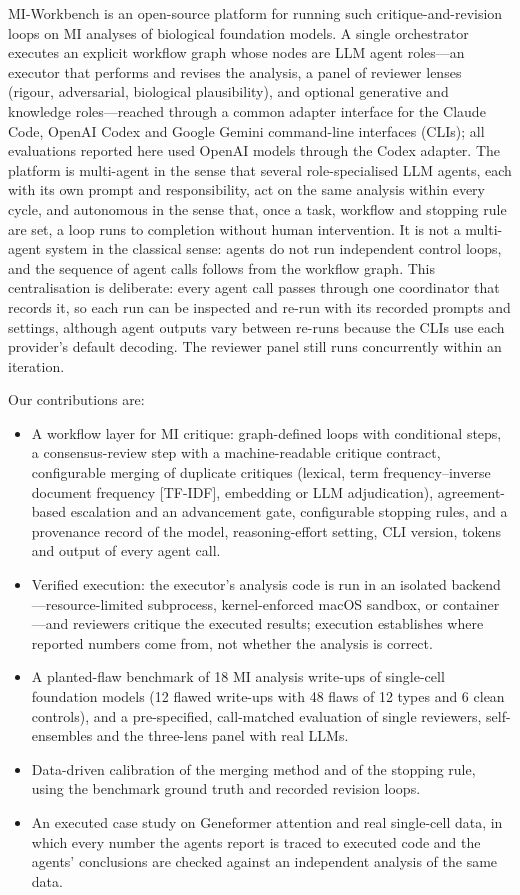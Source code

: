 MI-Workbench is an open-source platform for running such critique-and-revision loops on MI analyses of biological foundation models. A single orchestrator executes an explicit workflow graph whose nodes are LLM agent roles---an executor that performs and revises the analysis, a panel of reviewer lenses (rigour, adversarial, biological plausibility), and optional generative and knowledge roles---reached through a common adapter interface for the Claude Code, OpenAI Codex and Google Gemini command-line interfaces (CLIs); all evaluations reported here used OpenAI models through the Codex adapter. The platform is multi-agent in the sense that several role-specialised LLM agents, each with its own prompt and responsibility, act on the same analysis within every cycle, and autonomous in the sense that, once a task, workflow and stopping rule are set, a loop runs to completion without human intervention. It is not a multi-agent system in the classical sense: agents do not run independent control loops, and the sequence of agent calls follows from the workflow graph. This centralisation is deliberate: every agent call passes through one coordinator that records it, so each run can be inspected and re-run with its recorded prompts and settings, although agent outputs vary between re-runs because the CLIs use each provider's default decoding. The reviewer panel still runs concurrently within an iteration.

Our contributions are:
\begin{itemize}
  \item A workflow layer for MI critique: graph-defined loops with conditional steps, a consensus-review step with a machine-readable critique contract, configurable merging of duplicate critiques (lexical, term frequency--inverse document frequency [TF-IDF], embedding or LLM adjudication), agreement-based escalation and an advancement gate, configurable stopping rules, and a provenance record of the model, reasoning-effort setting, CLI version, tokens and output of every agent call.
  \item Verified execution: the executor's analysis code is run in an isolated backend---resource-limited subprocess, kernel-enforced macOS sandbox, or container---and reviewers critique the executed results; execution establishes where reported numbers come from, not whether the analysis is correct.
  \item A planted-flaw benchmark of 18 MI analysis write-ups of single-cell foundation models (12 flawed write-ups with 48 flaws of 12 types and 6 clean controls), and a pre-specified, call-matched evaluation of single reviewers, self-ensembles and the three-lens panel with real LLMs.
  \item Data-driven calibration of the merging method and of the stopping rule, using the benchmark ground truth and recorded revision loops.
  \item An executed case study on Geneformer attention and real single-cell data, in which every number the agents report is traced to executed code and the agents' conclusions are checked against an independent analysis of the same data.
\end{itemize}
